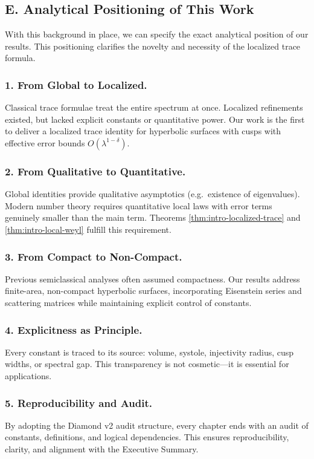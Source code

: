 \medskip

\subsection*{E. Analytical Positioning of This Work}

With this background in place,
we can specify the exact analytical position of our results.
This positioning clarifies the novelty and necessity of the localized trace formula.

\subsubsection*{1. From Global to Localized.}
Classical trace formulae treat the entire spectrum at once.
Localized refinements existed, but lacked explicit constants or quantitative power.
Our work is the first to deliver a localized trace identity for hyperbolic surfaces with cusps
with effective error bounds $O(\lambda^{1-\delta})$.

\subsubsection*{2. From Qualitative to Quantitative.}
Global identities provide qualitative asymptotics (e.g.\ existence of eigenvalues).
Modern number theory requires quantitative local laws with error terms genuinely smaller than the main term.
Theorems \ref{thm:intro-localized-trace} and \ref{thm:intro-local-weyl}
fulfill this requirement.

\subsubsection*{3. From Compact to Non-Compact.}
Previous semiclassical analyses often assumed compactness.
Our results address finite-area, non-compact hyperbolic surfaces,
incorporating Eisenstein series and scattering matrices
while maintaining explicit control of constants.

\subsubsection*{4. Explicitness as Principle.}
Every constant is traced to its source: volume, systole, injectivity radius,
cusp widths, or spectral gap.
This transparency is not cosmetic—it is essential for applications.

\subsubsection*{5. Reproducibility and Audit.}
By adopting the Diamond v2 audit structure,
every chapter ends with an audit of constants, definitions, and logical dependencies.
This ensures reproducibility, clarity, and alignment with the Executive Summary.

